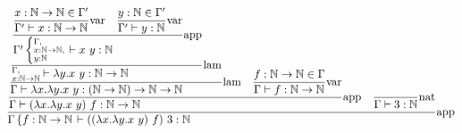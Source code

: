 \documentclass{article}
\newcommand{\st}[3][]{\ensuremath{\displaystyle\frac{#3\hfill}{#2\hfill} \text{#1}}}
\newcommand{\N}{\ensuremath \mathbb N}
\newcommand{\lam}[2]{\ensuremath{\lambda#1.#2}}
\begin{document}
\begin{equation*}
    \st[app]{
        \Gamma\left\{f:\N\to\N\right. \vdash ((\lam{x}{\lam{y}{x\ y}})\ f)\ 3:\N
    }{
        \st[app]{
            \Gamma\vdash (\lam{x}{\lam{y}{x\ y}})\ f: \N\to\N
        }{
            \st[lam]{
                \Gamma\vdash \lam{x}{\lam{y}{x\ y}}: (\N\to\N)\to\N\to\N
            }{
                \st[lam]{
                    \substack{\Gamma,\hfill\\x:\N\to\N}\vdash \lam{y}{x\ y}:\N\to\N
                }{
                    \st[app]{
                        \Gamma' \left\{ \substack{\Gamma,\hfill\\x:\N\to\N,\\y:\N\hfill} \right. \vdash x\ y:\N
                    }{
                        \st[var]{
                            \Gamma'\vdash x:\N\to\N
                        }{
                            x:\N\to\N\in\Gamma'
                        }
                        \quad
                        \st[var]{
                            \Gamma'\vdash y:\N
                        }{
                            y:\N\in\Gamma'
                        }
                    }
                }
            }
            \quad
            \st[var]{
                \Gamma\vdash f:\N\to\N
            }{
                f:\N\to\N\in\Gamma
            }
        }
        \quad
        \st[nat]{
            \Gamma\vdash 3:\N
        }{
        }
    }
\end{equation*}
\end{document}
